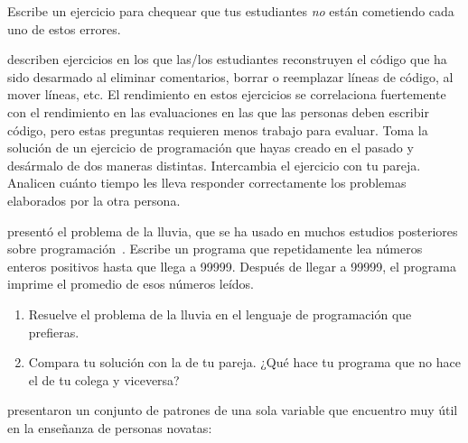 \noindent
Escribe un ejercicio para chequear que tus estudiantes \emph{no} están cometiendo cada uno de estos errores.


\cite{Chen2017} describen ejercicios en los que las/los estudiantes reconstruyen el código que ha sido desarmado
al eliminar comentarios,
borrar o reemplazar líneas de código,
al mover líneas,
etc.
El rendimiento en estos ejercicios se correlaciona fuertemente con el rendimiento en las evaluaciones
en las que las personas deben escribir código,
pero estas preguntas requieren menos trabajo para evaluar.
Toma la solución de un ejercicio de programación que hayas creado en el pasado y desármalo de dos maneras distintas.
Intercambia el ejercicio con tu pareja.
Analicen cuánto tiempo les lleva responder correctamente los problemas elaborados por la otra persona.


\cite{Solo1986} presentó el problema de la lluvia,
que se ha usado en muchos estudios posteriores sobre programación~\cite{Fisl2014,Simo2013,Sepp2015}.
Escribe un programa que repetidamente lea números enteros positivos hasta que llega a 99999.
Después de llegar a 99999,
el programa imprime el promedio de esos números leídos.

\begin{enumerate}

\item
  Resuelve el problema de la lluvia en el lenguaje de programación que prefieras.

\item
  Compara tu solución con la de tu pareja.
  ¿Qué hace tu programa que no hace el de tu colega y viceversa?

\end{enumerate}


\cite{Kuit2004,Byck2005,Saja2006} presentaron un conjunto de patrones de una sola variable
que encuentro muy útil en la enseñanza de personas novatas:

